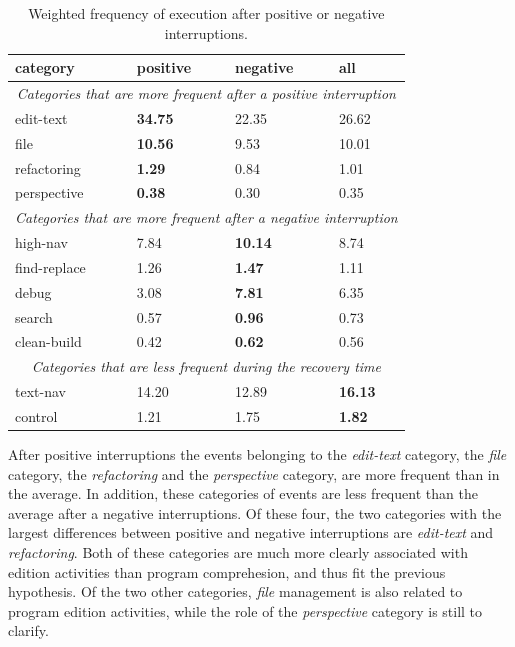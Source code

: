 \documentclass[times]{smrauth}
\begin{document}
\begin{table}[ht!]
\small
\renewcommand{\arraystretch}{1.3}
\caption{Weighted frequency of execution after positive or negative interruptions. }
\label{tbl:stats_events}
\centering
\begin{tabular}{|p{3cm}|p{2cm} |p{2cm}|p{2cm}|} 
  \hline 
category & positive & negative & all \\  
  \hline 
\multicolumn{4}{c}{\textit{Categories that are more frequent after a positive interruption}} \\
    \hline 
edit-text &  \textbf{34.75} & 22.35 & 26.62 \\
file &  \textbf{10.56} & 9.53 & 10.01\\
refactoring & \textbf{1.29} & 0.84 & 1.01 \\
perspective & \textbf{0.38} & 0.30 & 0.35  \\
    \hline 
\multicolumn{4}{c}{\textit{Categories that are more frequent after a negative interruption}} \\
    \hline 
high-nav & 7.84 & \textbf{10.14} & 8.74  \\
find-replace & 1.26 & \textbf{1.47} & 1.11 \\
debug & 3.08 & \textbf{7.81} & 6.35  \\
search & 0.57 & \textbf{0.96} & 0.73 \\
clean-build & 0.42 & \textbf{0.62} & 0.56  \\
    \hline 
\multicolumn{4}{c}{\textit{Categories that are less frequent during the recovery time}} \\
    \hline 
text-nav & 14.20 & 12.89 & \textbf{16.13} \\
control & 1.21 & 1.75 & \textbf{1.82} \\
\hline
\end{tabular}
\end{table}

After positive interruptions the events belonging to the \emph{edit-text} category, the \emph{file} category, the \emph{refactoring} and the \emph{perspective} category, are more frequent than in the average. In addition, these categories of events are less frequent than the average after a negative interruptions. Of these four, the two categories with the largest differences between positive and negative interruptions are \emph{edit-text} and \emph{refactoring}. Both of these categories are much more clearly associated with edition activities than program comprehesion, and thus fit the previous hypothesis. Of the two other categories, \emph{file} management is also related to program edition activities, while the role of the \emph{perspective} category is still to clarify.
\end{document}
